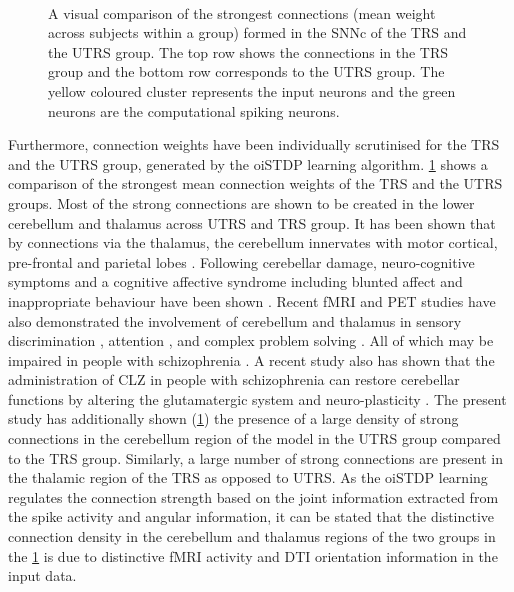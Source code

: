 \begin{figure}
	\\
	\caption{A visual comparison of the strongest connections (mean weight across subjects within a group) formed in the SNNc of the TRS and the UTRS group. The top row shows the connections in the TRS group and the bottom row corresponds to the UTRS group. The yellow coloured cluster represents the input neurons and the green neurons are the computational spiking neurons.}
	\label{fig:clz_TRS_UTRS}
\end{figure}

Furthermore, connection weights have been individually scrutinised for the TRS and the UTRS group, generated by the oiSTDP learning algorithm. \figurename \ref{fig:clz_TRS_UTRS} shows a comparison of the strongest mean connection weights of the TRS and the UTRS groups. Most of the strong connections are shown to be created in the lower cerebellum and thalamus across UTRS and TRS group. It has been shown that by connections via the thalamus, the cerebellum innervates with motor cortical, pre-frontal and parietal lobes \citep{ou1992anatomical}. Following cerebellar damage, neuro-cognitive symptoms and a cognitive affective syndrome including blunted affect and inappropriate behaviour have been shown \citep{baillieux2008cerebellar}. Recent fMRI and PET studies have also demonstrated the involvement of cerebellum and thalamus in sensory discrimination \citep{gao1996cerebellum}, attention \citep{courchesne1994model}, and complex problem solving \citep{kim1994activation}. All of which may be impaired in people with schizophrenia \citep{yeganeh2011role}. A recent study also has shown that the administration of CLZ in people with schizophrenia can restore cerebellar functions by altering the glutamatergic system and neuro-plasticity \citep{yeganeh2011role}.  The present study has additionally shown (\figurename \ref{fig:clz_TRS_UTRS}) the presence of a large density of strong connections in the cerebellum region of the model in the UTRS group compared to the TRS group. Similarly, a large number of strong connections are present in the thalamic region of the TRS as opposed to UTRS. As the oiSTDP learning regulates the connection strength based on the joint information extracted from the spike activity and angular information, it can be stated that the distinctive connection density in the cerebellum and thalamus regions of the two groups in the \figurename \ref{fig:clz_TRS_UTRS} is due to distinctive fMRI activity and DTI orientation information in the input data.

